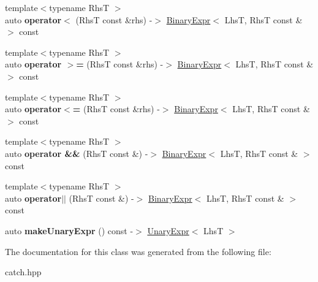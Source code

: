 \begin{DoxyCompactItemize}
\item 
\mbox{\label{classCatch_1_1ExprLhs_afd1ce21cb0be233a63cbdd7724adffea}} 
{\footnotesize template$<$typename RhsT $>$ }\\auto {\bfseries operator$<$} (RhsT const \&rhs) -\/$>$ \mbox{\hyperlink{classCatch_1_1BinaryExpr}{Binary\+Expr}}$<$ LhsT, RhsT const \& $>$ const
\item 
\mbox{\label{classCatch_1_1ExprLhs_a621240eaaf40e186cd96511c1d29d7b0}} 
{\footnotesize template$<$typename RhsT $>$ }\\auto {\bfseries operator $>$=} (RhsT const \&rhs) -\/$>$ \mbox{\hyperlink{classCatch_1_1BinaryExpr}{Binary\+Expr}}$<$ LhsT, RhsT const \& $>$ const
\item 
\mbox{\label{classCatch_1_1ExprLhs_a918090c28bee54222730159b56240af1}} 
{\footnotesize template$<$typename RhsT $>$ }\\auto {\bfseries operator$<$=} (RhsT const \&rhs) -\/$>$ \mbox{\hyperlink{classCatch_1_1BinaryExpr}{Binary\+Expr}}$<$ LhsT, RhsT const \& $>$ const
\item 
\mbox{\label{classCatch_1_1ExprLhs_ab7d8d931db0dcff46fb1d23114c738c0}} 
{\footnotesize template$<$typename RhsT $>$ }\\auto {\bfseries operator \&\&} (RhsT const \&) -\/$>$ \mbox{\hyperlink{classCatch_1_1BinaryExpr}{Binary\+Expr}}$<$ LhsT, RhsT const \& $>$ const
\item 
\mbox{\label{classCatch_1_1ExprLhs_ae9b4ee923b90af22c9e39261c2f03cd3}} 
{\footnotesize template$<$typename RhsT $>$ }\\auto {\bfseries operator$\vert$$\vert$} (RhsT const \&) -\/$>$ \mbox{\hyperlink{classCatch_1_1BinaryExpr}{Binary\+Expr}}$<$ LhsT, RhsT const \& $>$ const
\item 
\mbox{\label{classCatch_1_1ExprLhs_ab68bd6d5d3ae21b7fba9010150fba95d}} 
auto {\bfseries make\+Unary\+Expr} () const -\/$>$ \mbox{\hyperlink{classCatch_1_1UnaryExpr}{Unary\+Expr}}$<$ LhsT $>$
\end{DoxyCompactItemize}


The documentation for this class was generated from the following file\+:\begin{DoxyCompactItemize}
\item 
catch.\+hpp\end{DoxyCompactItemize}
